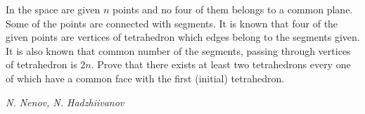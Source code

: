 In the space are given $n$ points and no four of them belongs to a common plane. Some of the points are connected with segments. It is known that four of the given points are vertices of tetrahedron which edges belong to the segments given. It is also known that common number of the segments, passing through vertices of tetrahedron is $2n$. Prove that there exists at least two tetrahedrons every one of which have a common face with the first (initial) tetrahedron.

\textit{N. Nenov, N. Hadzhiivanov}